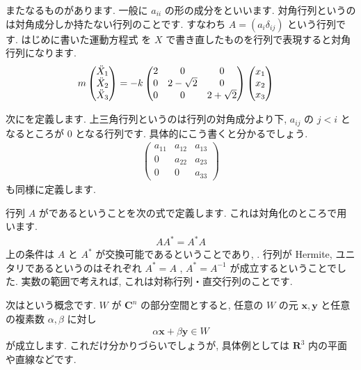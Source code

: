 \documentclass[openany, a4paper, oneside]{jsbook}
\begin{document}
またなるものがあります.
一般に $a_{ii}$ の形の成分をといいます.
対角行列というのは対角成分しか持たない行列のことです.
すなわち $A = (a_{i} \delta _{ij} )$ という行列です. はじめに書いた運動方程式
を $X$ で書き直したものを行列で表現すると対角行列になります.
\begin{align}
    m \begin{pmatrix} \ddot{X}_{1} \\ \ddot{X}_{2} \\ \ddot{X}_{3} \end{pmatrix}
    &= -k \begin{pmatrix} 2 & 0 & 0 \\ 0 & 2- \sqrt{2} & 0 \\ 0 & 0 & 2 + \sqrt{2} \end{pmatrix}
    \begin{pmatrix} x_{1} \\ x_{2} \\ x_{3} \end{pmatrix} \notag
\end{align}

次にを定義します.
上三角行列というのは行列の対角成分より下,  $a_{ij}$ の $j< i$ となるところが
 $0$ となる行列です. 具体的にこう書くと分かるでしょう.
\begin{align}
    \begin{pmatrix} a_{11} & a_{12} & a_{13} \\
                    0 & a_{22} & a_{23} \\
                    0 & 0 & a_{33}
    \end{pmatrix}
\end{align}
も同様に定義します.

行列 $A$ がであるということを次の式で定義します.
これは対角化のところで用います.
\begin{align}
    AA^{*} = A^{*}A
\end{align}
上の条件は $A$ と $A^{*}$ が交換可能であるということであり, .
行列が Hermite, ユニタリであるというのはそれぞれ $A^{*}=A$ ,  $A^{*} = A^{-1}$ が成立するということでした.
実数の範囲で考えれば, これは対称行列・直交行列のことです.

次はという概念です.
 $W$ が $\bm{C}^n$ の部分空間とすると,
任意の $W$ の元 $\bm{x},\bm{y}$ と任意の複素数 $\alpha,\beta$ に対し
\begin{align}
    \alpha \bm{x} + \beta \bm{y} \in W
\end{align}
が成立します. これだけ分かりづらいでしょうが, 具体例としては $\bm{R}^3$ 内の平面や直線などです.
\end{document}
